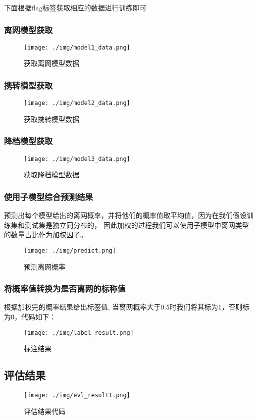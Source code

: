 \documentclass{article}
\begin{document}
下面根据flag标签获取相应的数据进行训练即可
\subsubsection{离网模型获取}
\begin{figure}[H]
	\centering
	\texttt{[image: ./img/model1\_data.png]}
	\caption{获取离网模型数据}
\end{figure}

\subsubsection{携转模型获取}
\begin{figure}[H]
	\centering
	\texttt{[image: ./img/model2\_data.png]}
	\caption{获取携转模型数据}
\end{figure}

\subsubsection{降档模型获取}
\begin{figure}[H]
	\centering
	\texttt{[image: ./img/model3\_data.png]}
	\caption{获取降档模型数据}
\end{figure}


\subsubsection{使用子模型综合预测结果}

预测出每个模型给出的离网概率，并将他们的概率值取平均值，因为在我们假设训练集和测试集是独立同分布的，
因此加权的过程我们可以使用子模型中离网类型的数量占比作为加权因子。

\begin{figure}[H]
	\centering
	\texttt{[image: ./img/predict.png]}
	\caption{预测离网概率}
\end{figure}

\subsubsection{将概率值转换为是否离网的标称值}
根据加权完的概率结果给出标签值, 当离网概率大于0.5时我们将其标为1，否则标为0，代码如下：
\begin{figure}[H]
	\centering
	\texttt{[image: ./img/label\_result.png]}
	\caption{标注结果}
\end{figure}

\subsection{评估结果}
\begin{figure}[H]
	\centering
	\texttt{[image: ./img/evl\_result1.png]}
	\caption{评估结果代码}
\end{figure}
\end{document}
